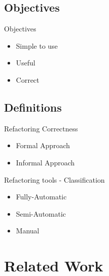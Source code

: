\documentclass[xcolor=dvipsnames, 14pt]{beamer}
\begin{document}
\subsection{Objectives}

\begin{frame}{Objectives}%
  \begin{itemize}
  \setlength\itemsep{2em}
  \item {
    Simple to use
  }
  \item {
    Useful
  }
  \item {
    Correct
  }
  \end{itemize}
\end{frame}

\subsection{Definitions}
\begin{frame}{Refactoring Correctness}
\begin{itemize}
\setlength\itemsep{2em}
\item Formal Approach
\item Informal Approach
\end{itemize}
\end{frame}
\begin{frame}{Refactoring tools - Classification}
  \begin{itemize}
  \setlength\itemsep{2em}
    \item {
    Fully-Automatic
  }
    \item {
    Semi-Automatic
  }
  \item {
    Manual
  }


  \end{itemize}
\end{frame}
\section{Related Work}
\end{document}
